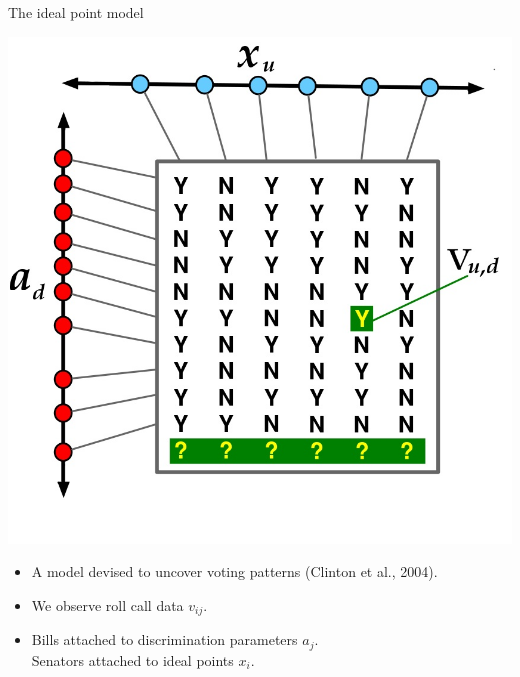 \message{ !name(sgerrish_prefpo.tex)}\documentclass{beamer}
\begin{document}
\begin{frame}{The ideal point model}
  \begin{center}
    \includegraphics[scale=0.6]{figs/ideal-point-intuition.jpg}
  \end{center}
  \begin{itemize}
  \item A model devised to uncover voting patterns (Clinton et al., 2004).
  \item We observe roll call data $v_{ij}$.
  \item Bills attached to discrimination parameters $a_j$.\\
    Senators attached to ideal points $x_i$.
  \end{itemize}
\end{frame}

\end{document}
